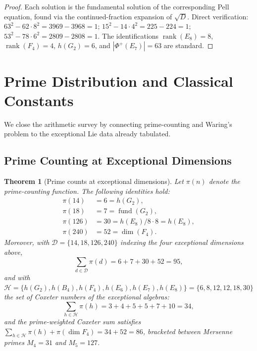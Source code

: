 \documentclass[11pt]{amsart}
\theoremstyle{plain}
\newtheorem{theorem}{Theorem}[section]
\theoremstyle{definition}
\theoremstyle{remark}
\renewcommand{\Phi}{\varPhi}
\begin{document}
\begin{proof}
Each solution is the fundamental solution of the corresponding Pell
equation, found via the continued-fraction expansion of $\sqrt{D}$.
Direct verification: $63^2 - 62\cdot8^2 = 3969 - 3968 = 1$;
$15^2 - 14\cdot4^2 = 225 - 224 = 1$;
$53^2 - 78\cdot6^2 = 2809 - 2808 = 1$.
The identifications $\operatorname{rank}(E_8)=8$,
$\operatorname{rank}(F_4)=4$, $h(G_2)=6$, and
$|\Phi^+(E_7)|=63$ are standard.
\end{proof}


\section{Prime Distribution and Classical Constants}%
\label{sec:prime-dist}

We close the arithmetic survey by connecting prime-counting and Waring's
problem to the exceptional Lie data already tabulated.

\subsection{Prime Counting at Exceptional Dimensions}

\begin{theorem}[Prime counts at exceptional dimensions]
\label{thm:pi-exceptional}
Let $\pi(n)$ denote the prime-counting function. The following
identities hold:
\begin{align*}
  \pi(14)  &= 6  = h(G_2),\\
  \pi(18)  &= 7  = \operatorname{fund}(G_2),\\
  \pi(126) &= 30 = h(E_8)/8 \cdot 8 = h(E_8),\\
  \pi(240) &= 52 = \dim(F_4).
\end{align*}
Moreover, with $\mathcal{D} = \{14,18,126,240\}$ indexing the four
exceptional dimensions above,
\[
  \sum_{d\in\mathcal{D}} \pi(d) = 6+7+30+52 = 95,
\]
and with $\mathcal{H} = \{h(G_2), h(B_4), h(F_4), h(E_6), h(E_7),
h(E_8)\} = \{6,8,12,12,18,30\}$ the set of Coxeter numbers of the
exceptional algebras:
\[
  \sum_{h \in \mathcal{H}} \pi(h) = 3+4+5+5+7+10 = 34,
\]
and the prime-weighted Coxeter sum satisfies
$\sum_{h\in\mathcal{H}} \pi(h) + \pi(\dim F_4) = 34 + 52 = 86$,
bracketed between Mersenne primes $M_4 = 31$ and $M_5 = 127$.
\end{theorem}
\end{document}
